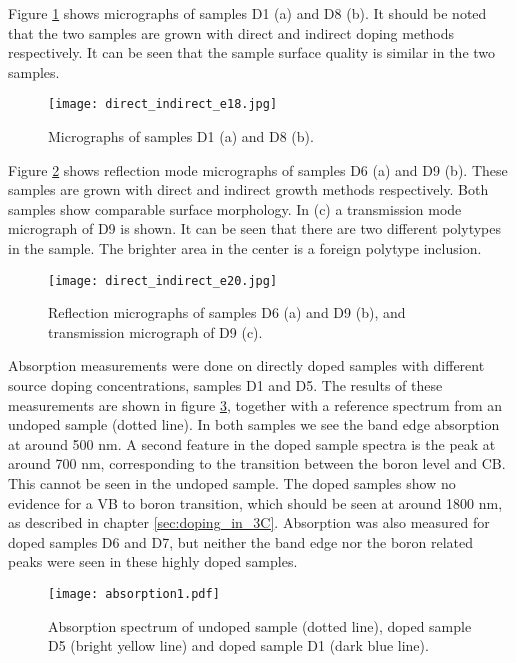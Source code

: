 Figure \ref{fig:B_doped_micrographs2} shows micrographs of samples D1 (a) and D8 (b). It should be noted that the two samples are grown with direct and indirect doping methods respectively. It can be seen that the sample surface quality is similar in the two samples. 

\begin{figure}[H]
\begin{center}
\texttt{[image: direct\_indirect\_e18.jpg]}
\caption{Micrographs of samples D1 (a) and D8 (b). 
\label{fig:B_doped_micrographs2}}
\end{center}
\end{figure}


Figure \ref{fig:BGe20_micrograph} shows reflection mode micrographs of samples D6 (a) and D9 (b). These samples are grown with direct and indirect growth methods respectively. Both samples show comparable surface morphology. In (c) a transmission mode micrograph of D9 is shown. It can be seen that there are two different polytypes in the sample. The brighter area in the center is a foreign polytype inclusion. 

\begin{figure}[h]
\begin{center}
\texttt{[image: direct\_indirect\_e20.jpg]}
\caption{Reflection micrographs of samples D6 (a) and D9 (b), and transmission micrograph of D9 (c). 
\label{fig:BGe20_micrograph}}
\end{center}
\end{figure}

Absorption measurements were done on directly doped samples with different source doping concentrations, samples D1 and D5. The results of these measurements are shown in figure \ref{fig:abs1}, together with a reference spectrum from an undoped sample (dotted line). In both samples we see the band edge absorption at around 500 nm. A second feature in the doped sample spectra is the peak at around 700 nm, corresponding to the transition between the boron level and CB. This cannot be seen in the undoped sample. The doped samples show no evidence for a VB to boron transition, which should be seen at around 1800 nm, as described in chapter \ref{sec:doping_in_3C}. Absorption was also measured for doped samples D6 and D7, but neither the band edge nor the boron related peaks were seen in these highly doped samples. 

\begin{figure}[h]
\begin{center}
\texttt{[image: absorption1.pdf]}
\caption{Absorption spectrum of undoped sample (dotted line), doped sample D5 (bright yellow line) and doped sample D1 (dark blue line). 
\label{fig:abs1}}
\end{center}
\end{figure}

